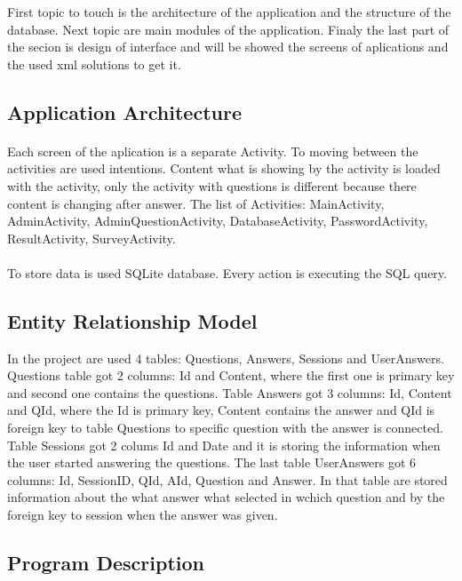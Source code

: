 \documentclass[conference]{IEEEtran}
\begin{document}
First topic to touch is the architecture of the application and
the structure of the database. Next topic are main modules of the 
application. Finaly the last part of the secion is design of interface and will 
be showed the screens of aplications and the used xml solutions to get it.

\subsection{Application Architecture}

\paragraph{} Each screen of the aplication is a separate Activity. To moving between the 
activities are used intentions. Content what is showing by the activity is loaded
with the activity, only the activity with questions is different because there 
content is changing after answer. The list of Activities: MainActivity, AdminActivity, 
AdminQuestionActivity, DatabaseActivity, PasswordActivity, ResultActivity, SurveyActivity.

\paragraph{} To store data is used SQLite database. Every action is executing the SQL query.

\subsection{Entity Relationship Model}

In the project are used 4 tables: Questions, Answers, Sessions and UserAnswers. 
Questions table got 2 columns: Id and Content, where the first one is primary key 
and second one contains the questions. Table Answers got 3 columns: Id, Content 
and QId, where the Id is primary key, Content contains the answer and QId is foreign key to table 
Questions to specific question with the answer is connected. Table Sessions got 2 colums Id and Date 
and it is storing the information when the user started answering the questions.
The last table UserAnswers got 6 columns: Id, SessionID, QId, AId, Question and Answer. 
In that table are stored information about the what answer what selected in wchich question and by the
foreign key to session when the answer was given.

\subsection{Program Description}
\end{document}
